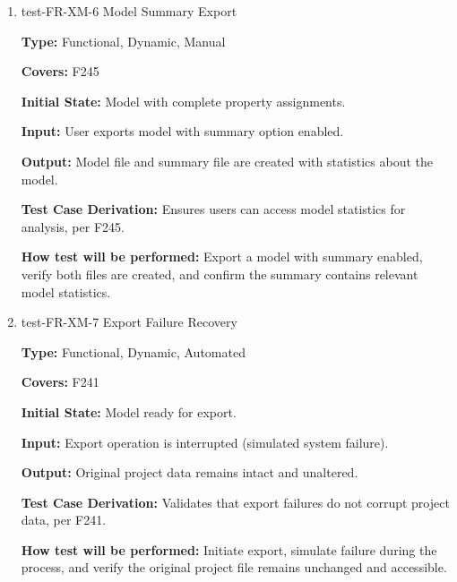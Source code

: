 \documentclass[12pt, titlepage]{article}
\begin{document}
\begin{enumerate}
\textbf{Input:} User initiates export operation.
					
\textbf{Output:} Progress bar displays export progress with visual indicators.

\textbf{Test Case Derivation:} Validates that users receive feedback during export operations, as specified in F244.
					
\textbf{How test will be performed:} Export a large model, observe the progress bar updates, and verify the progress indicators accurately reflect export status.

\item{test-FR-XM-6 Model Summary Export\\}
\label{sec:t-xm-6}

\textbf{Type:} Functional, Dynamic, Manual

\textbf{Covers:} F245
					
\textbf{Initial State:} Model with complete property assignments.
					
\textbf{Input:} User exports model with summary option enabled.
					
\textbf{Output:} Model file and summary file are created with statistics about the model.

\textbf{Test Case Derivation:} Ensures users can access model statistics for analysis, per F245.
					
\textbf{How test will be performed:} Export a model with summary enabled, verify both files are created, and confirm the summary contains relevant model statistics.

\item{test-FR-XM-7 Export Failure Recovery\\}
\label{sec:t-xm-7}

\textbf{Type:} Functional, Dynamic, Automated

\textbf{Covers:} F241
					
\textbf{Initial State:} Model ready for export.
					
\textbf{Input:} Export operation is interrupted (simulated system failure).
					
\textbf{Output:} Original project data remains intact and unaltered.

\textbf{Test Case Derivation:} Validates that export failures do not corrupt project data, per F241.
					
\textbf{How test will be performed:} Initiate export, simulate failure during the process, and verify the original project file remains unchanged and accessible.


\end{enumerate}
\end{document}
